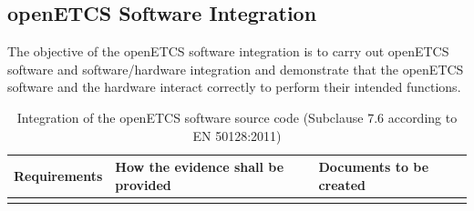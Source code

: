 \documentclass{template/openetcs_report}
\begin{document}
\subsection{openETCS Software Integration}
\begin{flushleft}
The objective of the openETCS software integration is to carry out openETCS software and software/hardware integration and demonstrate that the openETCS software and the hardware interact correctly to perform their intended functions.
\end{flushleft}
{\footnotesize\sffamily\centering
\begin{longtable}{|p{2cm}|p{9cm}|p{3cm}|}
\caption{Integration of the openETCS software source code (Subclause 7.6 according to EN 50128:2011)}\\
\hline
\bfseries Requirements & \bfseries How the evidence shall be provided & \bfseries Documents to be created\\
\hline
\hline
\endhead
\hline
\endfoot


\end{longtable}}
\end{document}
